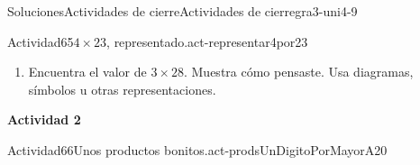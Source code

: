 \documentclass[twoside,10pt,]{article}
\begin{document}
\begin{solutions-section}{Soluciones}{Actividades de cierre}{}{Actividades de cierre}{}{}{gra3-uni4-9}
\begin{activitysolution}{Actividad}{65}{\(4\times 23\), representado.}{act-representar4por23}
\begin{enumerate}
\begin{sidebyside}{2}{0}{0.3}{0.05}
\begin{sbspanel}{0.05}[center]
A%
\end{sbspanel}%
\begin{sbspanel}{0.6}[center]%
\texttt{[image: external/svg-source/tikz-file-152971.pdf]}
\end{sbspanel}%
\end{sidebyside}%
\begin{sidebyside}{2}{0}{0.3}{0.05}%
\begin{sbspanel}{0.05}[center]%
B%
\end{sbspanel}%
\begin{sbspanel}{0.6}[center]%
\texttt{[image: external/svg-source/tikz-file-152972.pdf]}
\end{sbspanel}%
\end{sidebyside}%
\begin{sidebyside}{2}{0}{0.3}{0.05}%
\begin{sbspanel}{0.05}[center]%
C%
\end{sbspanel}%
\begin{sbspanel}{0.6}[center]%
\texttt{[image: external/svg-source/tikz-file-152973.pdf]}
\end{sbspanel}%
\end{sidebyside}%
\begin{sidebyside}{2}{0}{0.3}{0.05}%
\begin{sbspanel}{0.05}[center]%
D%
\end{sbspanel}%
\begin{sbspanel}{0.6}[center]%
\texttt{[image: external/svg-source/tikz-file-152974.pdf]}
\end{sbspanel}%
\end{sidebyside}%
%
\begin{enumerate}
\item{}¿Qué observas sobre los números de sus diagramas?%
\item{}¿Cuál diagrama usarías para encontrar el valor de \(4\times 23\)? Explica tu razonamiento.%
\end{enumerate}
\item{}Encuentra el valor de \(3\times 28\). Muestra cómo pensaste. Usa diagramas, símbolos u otras representaciones.%
\end{enumerate}
\end{activitysolution}%
\par\medskip
\noindent\textbf{\large{}\space\textperiodcentered\space{}Actividad 2}
\begin{activitysolution}{Actividad}{66}{Unos productos bonitos.}{act-prodsUnDigitoPorMayorA20}%

\end{activitysolution}
\end{solutions-section}
\end{document}
